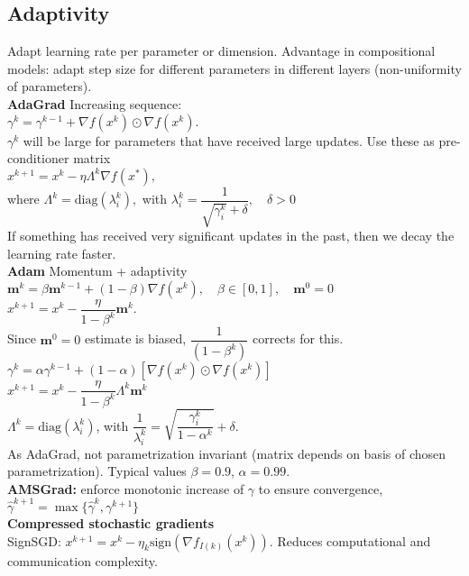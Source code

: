 \subsection*{Adaptivity}
Adapt learning rate per parameter or dimension. Advantage in compositional models: adapt step size for different parameters in different layers (non-uniformity of parameters).\\
\textbf{AdaGrad} Increasing sequence:\\
$\gamma^k = \gamma^{k-1} + \nabla f(x^k)\odot\nabla f(x^k).$\\
$\gamma^k$ will be large for parameters that have received large updates. Use these as pre-conditioner matrix\\
$x^{k+1} = x^k - \eta\Lambda^k\nabla f(x^*),$\\ where $\Lambda^k = \text{diag}(\lambda_i^k),$ with $\lambda_i^k = \dfrac{1}{\sqrt{\gamma_i^k}+\delta}, \quad \delta > 0$\\
If something has received very significant updates in the past, then we decay the learning rate faster.\\
\textbf{Adam} Momentum + adaptivity\\
$\textbf{m}^k = \beta \textbf{m}^{k-1}+(1-\beta)\nabla f(x^k), \quad \beta\in [0,1],\quad \textbf{m}^0=0$\\
$x^{k+1}=x^k-\dfrac{\eta}{1-\beta^k}\textbf{m}^k$. \\
Since $\textbf{m}^0 = 0$ estimate is biased, $\dfrac{1}{(1-\beta^k)}$ corrects for this.\\
$\gamma^k=\alpha\gamma^{k-1} + (1-\alpha)\left[\nabla f(x^k)\odot\nabla f(x^k)\right]$\\
$x^{k+1}=x^k-\dfrac{\eta}{1-\beta^k}\Lambda^k\textbf{m}^k$\\
$\Lambda^k=\text{diag}(\lambda_i^k)$, with $\dfrac{1}{\lambda_i^k}=\sqrt{\dfrac{\gamma_i^k}{1-\alpha^k}}+\delta$.\\
As AdaGrad, not parametrization invariant (matrix depends on basis of chosen parametrization). Typical values $\beta=0.9$, $\alpha=0.99$.\\
\textbf{AMSGrad:} enforce monotonic increase of $\gamma$ to ensure convergence, $\hat{\gamma}^{k+1}=\max\{\hat{\gamma}^k,\gamma^{k+1}\}$\\
\textbf{Compressed stochastic gradients}\\
SignSGD: $x^{k+1} = x^k-\eta_k\text{sign}\left(\nabla f_{I(k)}(x^k)\right)$. Reduces computational and communication complexity.


